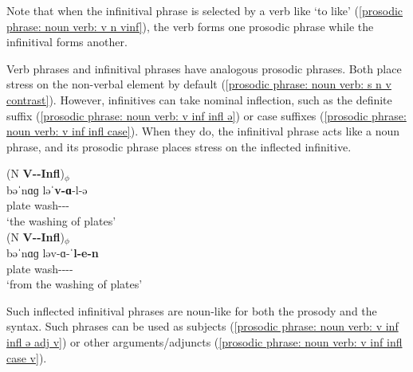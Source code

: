 Note that when the infinitival phrase is selected by a verb like `to like' (\ref{prosodic phrase: noun verb: v n vinf}), the verb forms one prosodic phrase while the infinitival forms another. 

Verb phrases and infinitival phrases have analogous prosodic phrases. Both place stress on the non-verbal element by default (\ref{prosodic phrase: noun verb: s n v contrast}). However, infinitives can take nominal inflection, such as the definite suffix (\ref{prosodic phrase: noun verb: v inf infl ə}) or case suffixes (\ref{prosodic phrase: noun verb: v inf infl case}). When they do, the infinitival phrase acts like a noun phrase, and its prosodic phrase places stress on the inflected infinitive. 

\begin{exe}
	\ex \begin{xlist}
		\ex \glll  (N \textbf{V-{\infgloss}-Infl})$_\phi$ \\ 
		bəˈ{nɑɡ}  ləˈ\textbf{v-ɑ}-l-ə \\
		plate  wash-{\thgloss}-{\infgloss}-{} \\
		\trans `the washing of plates'\label{prosodic phrase: noun verb: v inf infl ə} 
		\\  
		\ex \glll  (N \textbf{V-{\infgloss}-Infl})$_\phi$ \\ 
		bəˈ{nɑɡ}  lə{v-ɑ}-ˈ\textbf{l-e-n} \\
		plate  wash-{\thgloss}-{\infgloss}-{\abl}-{} \\
		\trans `from the washing of plates'\label{prosodic phrase: noun verb: v inf infl case} 
		\\  
	\end{xlist}
\end{exe}

Such inflected infinitival phrases are noun-like for both the prosody and the syntax. Such phrases can be used as subjects (\ref{prosodic phrase: noun verb: v inf infl ə adj v}) or other arguments/adjuncts (\ref{prosodic phrase: noun verb: v inf infl case v}). 

